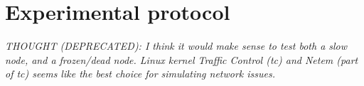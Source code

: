 

\section{Experimental protocol}\label{sec:experimental-protocol}



\textit{THOUGHT (DEPRECATED): I think it would make sense to test both a slow node, and a frozen/dead node.
Linux kernel Traffic Control (tc) and Netem (part of tc) seems like the best choice for simulating network issues.}

